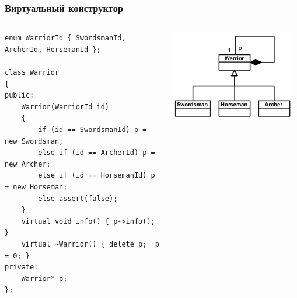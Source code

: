 \documentclass{../cscslides}
\begin{document}
    \begin{frame}[fragile]
        \frametitle{Виртуальный конструктор}
        \begin{columns}
            \begin{column}{0.6\textwidth}
                \begin{footnotesize}
                    \begin{verbatim}
enum WarriorId { SwordsmanId, ArcherId, HorsemanId };

class Warrior
{
public:  
    Warrior(WarriorId id)
    {
        if (id == SwordsmanId) p = new Swordsman;
        else if (id == ArcherId) p = new Archer;
        else if (id == HorsemanId) p = new Horseman;
        else assert(false);
    }
    virtual void info() { p->info(); }
    virtual ~Warrior() { delete p;  p = 0; }
private:
    Warrior* p;
};
                    \end{verbatim}
                \end{footnotesize}
            \end{column}
            \begin{column}{0.4\textwidth}
                \begin{center}
                    \includegraphics[width=0.95\textwidth]{warriorVirtualCtor.png}
                \end{center}
            \end{column}
        \end{columns}
    \end{frame}
\end{document}
